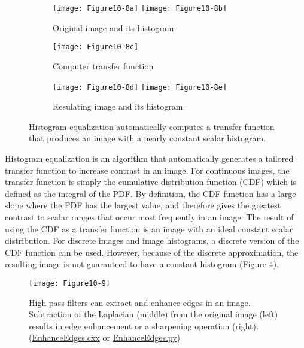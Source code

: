 \begin{figure}[htb]
	\begin{subfigure}[h]{0.86\linewidth}
		\texttt{[image: Figure10-8a]}
		\texttt{[image: Figure10-8b]}
		\captionsetup{justification=centering}
		\caption*{Original image and its histogram}
		\label{fig:Figure10-8a}
	\end{subfigure}
	\hfill

	\begin{subfigure}[h]{0.48\linewidth}
		\texttt{[image: Figure10-8c]}
		\captionsetup{justification=centering}
		\caption*{Computer transfer function}
		\label{fig:Figure10-8c}
	\end{subfigure}

	\hfill
	\begin{subfigure}[h]{0.86\linewidth}
		\texttt{[image: Figure10-8d]}
		\texttt{[image: Figure10-8e]}
		\captionsetup{justification=centering}
		\caption*{Resulating image and its histogram}
		\label{fig:Figure10-8d}
	\end{subfigure}
	\caption{Histogram equalization automatically computes a transfer function that produces an image with a nearly constant scalar histogram.}\label{fig:Figure10-8}
\end{figure}

Histogram equalization is an algorithm that automatically generates a tailored transfer function to increase contrast in an image. For continuous images, the transfer function is simply the cumulative distribution function (CDF) which is defined as the integral of the PDF. By definition, the CDF function has a large slope where the PDF has the largest value, and therefore gives the greatest contrast to scalar ranges that occur most frequently in an image. The result of using the CDF as a transfer function is an image with an ideal constant scalar distribution. For discrete images and image histograms, a discrete version of the CDF function can be used. However, because of the discrete approximation, the resulting image is not guaranteed to have a constant histogram (Figure \ref{fig:Figure10-8}).

\begin{figure}[!htb]
	\centering
	\texttt{[image: Figure10-9]}
	\caption{High-pass filters can extract and enhance edges in an image. Subtraction of the Laplacian (middle) from the original image (left) results in edge enhancement or a sharpening operation (right). (\href{https://lorensen.github.io/VTKExamples/site/Cxx/ImageProcessing/EnhanceEdges/}{EnhanceEdges.cxx} or \href{https://lorensen.github.io/VTKExamples/site/Python/ImageProcessing/EnhanceEdges/}{EnhanceEdges.py})}
	\label{fig:Figure10-9}
\end{figure}

